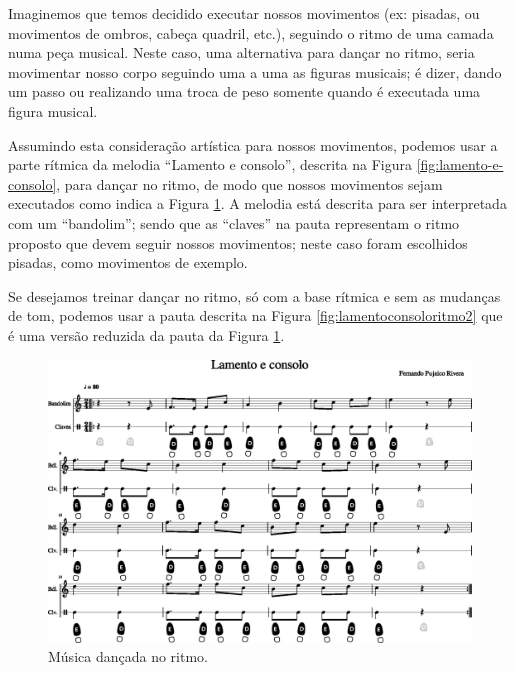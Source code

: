 \begin{example}
\label{ex:dancaritmo1}
Imaginemos que temos decidido executar nossos movimentos (ex: pisadas, ou movimentos de ombros, cabeça quadril, etc.),
seguindo o ritmo de uma camada numa peça musical.
Neste caso, uma alternativa para dançar no ritmo, 
seria movimentar nosso corpo seguindo uma a uma as figuras musicais;
é dizer, dando um passo ou realizando uma troca de peso somente quando é executada uma figura musical.

Assumindo esta  consideração artística para nossos movimentos, 
podemos usar a parte rítmica da melodia ``Lamento e consolo'', descrita na Figura \ref{fig:lamento-e-consolo},
para dançar no ritmo, 
de modo que nossos movimentos sejam executados como indica a Figura \ref{fig:lamentoconsoloritmo1}.
A melodia está descrita para ser interpretada com um ``bandolim'';
sendo que as ``claves'' na pauta representam o ritmo proposto que devem seguir nossos movimentos;
neste caso foram escolhidos pisadas, como movimentos de exemplo.

Se desejamos treinar dançar no ritmo, só com a base rítmica e sem as mudanças de tom,  
podemos usar a pauta descrita na Figura \ref{fig:lamentoconsoloritmo2} que é uma versão 
reduzida da pauta da Figura \ref{fig:lamentoconsoloritmo1}.

\end{example}
\begin{figure}
    \centering
    \includegraphics[width=\textwidth]{chapters/cap-musicalidade-tecnica/lamento-e-consolo-clave-ritmo-1.eps}
    \caption{Música dançada no ritmo.}
    \label{fig:lamentoconsoloritmo1}
\end{figure}


